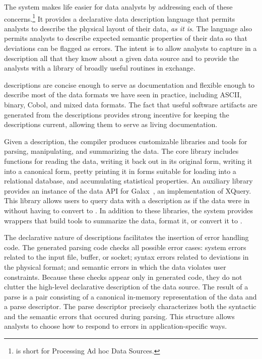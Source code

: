 \documentclass{sig-alternate}
\begin{document}
The \pads{} system makes life easier for data analysts by addressing
each of these concerns.\footnote{
  \pads{} is short for Processing Ad hoc Data Sources.
}
It provides a declarative data description
language that permits analysts to describe the physical layout of
their data, \textit{as it is}.  The language also permits analysts to
describe expected semantic properties of their data so that deviations can
be flagged as errors. The intent is to allow analysts to capture in a
\pads{} description all that they know about a given data source
and to provide the analysts with a library of broadly useful routines in exchange. 


\pads{} descriptions are concise enough to
serve as documentation and flexible enough to describe most of
the data formats we have seen in practice, including ASCII, binary,
Cobol, and mixed data formats.  The fact that useful software
artifacts are generated from the descriptions provides strong
incentive for keeping the descriptions current, allowing them to serve
as living documentation.  

Given a \pads{} description, the \pads{} compiler produces customizable \C{} libraries
and tools for parsing, manipulating, and summarizing the data. 
The core \C{} library includes functions for reading the data, writing it 
back out in its original form, writing it into a canonical \xml{} form, pretty printing
it in forms suitable for loading into a relational database, and accumulating  
statistical properties.  An auxiliary library provides 
an instance of the data API for Galax~\cite{galax,galaxmanual}, an implementation of XQuery.  This 
library allows users to query data with a \pads{} description as if the data were
in \xml{} without having to convert to \xml{}.  In addition to these libraries,
the \pads{} system provides wrappers that build tools to 
summarize the data, format it,  or convert it to \xml{}.

The declarative nature of \pads{} descriptions facilitates the
insertion of error handling code.
The generated parsing code checks all possible error cases: system
errors related to the input file, buffer, or socket; syntax errors
related to deviations in the physical format; and semantic errors in
which the data violates user constraints.  Because these checks appear
only in generated code, they do not clutter the high-level declarative
description of the data source.
The result of a parse is a pair consisting of a canonical in-memory
representation of the data and a parse descriptor. The parse
descriptor precisely characterizes both the syntactic and the semantic
errors that occured during parsing.  This structure allows analysts
to choose how to respond to errors in application-specific ways.  
\end{document}
